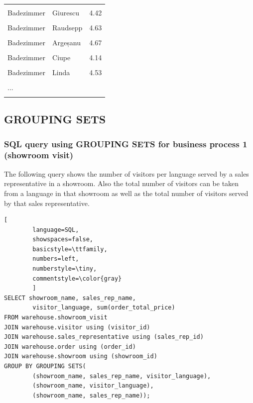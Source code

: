 \documentclass[letterpaper,12pt]{article}
\begin{document}
\begin{longtable}{p{4cm}p{4cm}p{2cm}}
        \hline \\
        Badezimmer & Giurescu & 4.42 \\
        \hline \\
        Badezimmer & Raudsepp & 4.63 \\
        \hline \\
        Badezimmer & Argeșanu & 4.67 \\
        \hline \\
        Badezimmer & Ciupe & 4.14 \\
        \hline \\
        Badezimmer & Linda & 4.53 \\
        \hline \\
        ... \\
        \hline \\
\end{longtable} 
\endgroup  

\subsection{GROUPING SETS}

\subsubsection{SQL query using GROUPING SETS for business process 1 (showroom visit)}

The following query shows the number of visitors per language served by a sales representative in a showroom. Also the total number of visitors can be taken from a language in that showroom as well as the total number of visitors served by that sales representative.

\begin{lstlisting}[
        language=SQL,
        showspaces=false,
        basicstyle=\ttfamily,
        numbers=left,
        numberstyle=\tiny,
        commentstyle=\color{gray}
        ]
SELECT showroom_name, sales_rep_name, 
        visitor_language, sum(order_total_price)
FROM warehouse.showroom_visit
JOIN warehouse.visitor using (visitor_id)
JOIN warehouse.sales_representative using (sales_rep_id)
JOIN warehouse.order using (order_id)
JOIN warehouse.showroom using (showroom_id)
GROUP BY GROUPING SETS(
        (showroom_name, sales_rep_name, visitor_language),
        (showroom_name, visitor_language),
        (showroom_name, sales_rep_name));
\end{lstlisting} 
\end{document}
